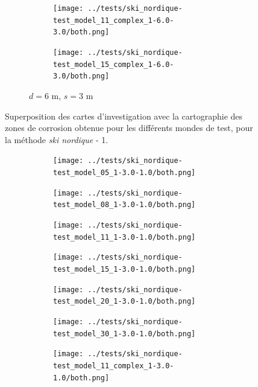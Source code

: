 \documentclass[english,RandD]{rapportPFE}  %
\begin{document}
\begin{figure}[H]
\begin{subfigure}[t]{\linewidth}
\begin{subfigure}[t]{0.11\linewidth}
					\texttt{[image: ../tests/ski\_nordique-test\_model\_11\_complex\_1-6.0-3.0/both.png]}
				\end{subfigure}
				\hfill
				\begin{subfigure}[t]{0.11\linewidth}
					\texttt{[image: ../tests/ski\_nordique-test\_model\_15\_complex\_1-6.0-3.0/both.png]}
				\end{subfigure}
				\caption{$d = 6$ m, $s = 3$ m}
			\end{subfigure}
			\caption{Superposition des cartes d'investigation avec la cartographie des zones de corrosion obtenue pour les différents mondes de test, pour la méthode \textit{ski nordique} - 1.}
			\label{fig:ski_nordique_resultats}
		\end{figure}

		\begin{figure}[H]
			\centering
			\begin{subfigure}[t]{\linewidth}
				\centering
				\begin{subfigure}[t]{0.11\linewidth}
					\texttt{[image: ../tests/ski\_nordique-test\_model\_05\_1-3.0-1.0/both.png]}
				\end{subfigure}
				\hfill
				\begin{subfigure}[t]{0.11\linewidth}
					\texttt{[image: ../tests/ski\_nordique-test\_model\_08\_1-3.0-1.0/both.png]}
				\end{subfigure}
				\hfill
				\begin{subfigure}[t]{0.11\linewidth}
					\texttt{[image: ../tests/ski\_nordique-test\_model\_11\_1-3.0-1.0/both.png]}
				\end{subfigure}
				\hfill
				\begin{subfigure}[t]{0.11\linewidth}
					\texttt{[image: ../tests/ski\_nordique-test\_model\_15\_1-3.0-1.0/both.png]}
				\end{subfigure}
				\hfill
				\begin{subfigure}[t]{0.11\linewidth}
					\texttt{[image: ../tests/ski\_nordique-test\_model\_20\_1-3.0-1.0/both.png]}
				\end{subfigure}
				\hfill
				\begin{subfigure}[t]{0.11\linewidth}
					\texttt{[image: ../tests/ski\_nordique-test\_model\_30\_1-3.0-1.0/both.png]}
				\end{subfigure}
				\hfill
				\begin{subfigure}[t]{0.11\linewidth}
					\texttt{[image: ../tests/ski\_nordique-test\_model\_11\_complex\_1-3.0-1.0/both.png]}
				\end{subfigure}

\end{subfigure}
\end{figure}
\end{document}
